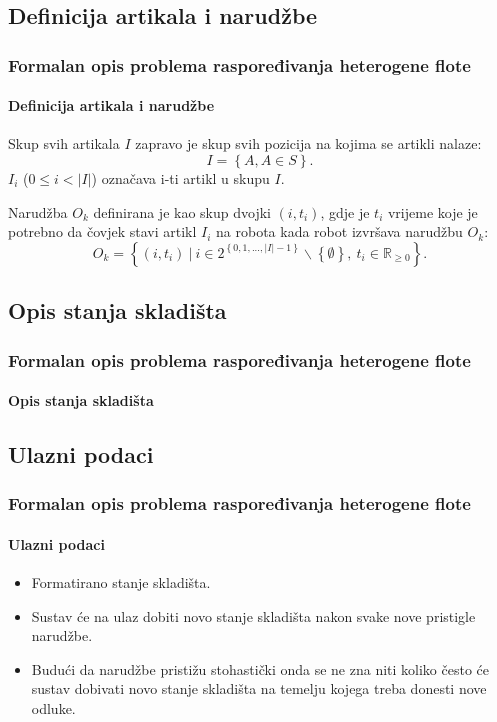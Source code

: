 \documentclass{beamer}
\begin{document}
\subsection{Definicija artikala i narudžbe}
\begin{frame}
\frametitle{Formalan opis problema raspoređivanja heterogene flote}
\framesubtitle{Definicija artikala i narudžbe}
Skup svih artikala $I$ zapravo je skup svih pozicija na kojima se artikli nalaze:
\begin{equation}
I = \left\{A, A \in S\right\}.
\end{equation}
$I_i$ ($0 \le i < |I|$) označava i-ti artikl u skupu $I$.

Narudžba $O_k$ definirana
je kao skup dvojki $(i, t_{i})$, gdje je $t_{i}$ vrijeme koje je potrebno
da čovjek stavi artikl $I_i$ na robota kada robot izvršava narudžbu $O_k$:
\begin{equation}
O_k = \left\{ (i, t_{i})\ |\ i \in 2^{\left\{0, 1, ..., |I|-1\right\}}\backslash\left\{\emptyset\right\},\ t_{i} \in \mathbb{R}_{\ge0}\right\}.
\end{equation}
\end{frame}

\subsection{Opis stanja skladišta}
\begin{frame}
\frametitle{Formalan opis problema raspoređivanja heterogene flote}
\framesubtitle{Opis stanja skladišta}
\end{frame}

\subsection{Ulazni podaci}
\begin{frame}
\frametitle{Formalan opis problema raspoređivanja heterogene flote}
\framesubtitle{Ulazni podaci}
\begin{itemize}
    \item Formatirano stanje skladišta.
    \item Sustav će na ulaz dobiti novo stanje skladišta nakon svake nove pristigle narudžbe.
    \item Budući da narudžbe pristižu stohastički onda se ne zna niti koliko često će sustav dobivati novo stanje skladišta na temelju kojega treba donesti nove odluke.
\end{itemize}
\end{frame}
\end{document}
